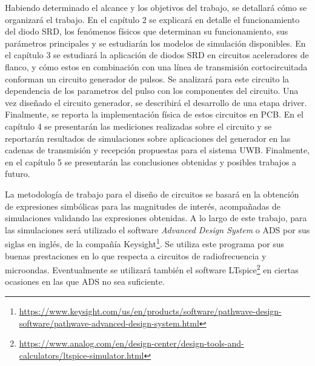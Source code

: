 Habiendo determinado el alcance y los objetivos del trabajo, se detallará cómo
se organizará el trabajo. En el capítulo 2 se explicará en detalle el
funcionamiento del diodo SRD, los fenómenos físicos que determinan su
funcionamiento, sus parámetros principales y se estudiarán los modelos de
simulación disponibles. En el capítulo 3 se estudiará la aplicación de diodos
SRD en circuitos aceleradores de flanco, y cómo estos en combinación con una
línea de transmisión cortocircuitada conforman un circuito generador de pulsos.
Se analizará para este circuito la dependencia de los parametros del pulso con
los componentes del circuito. Una vez diseñado el circuito generador, se
describirá el desarrollo de una etapa driver. Finalmente, se reporta  la
implementación física de estos circuitos en PCB. En el capítulo 4 se presentarán
las mediciones realizadas sobre el circuito y se reportarán resultados de
simulaciones sobre aplicaciones del generador en las cadenas de transmisión y
recepción propuestas para el sistema UWB. Finalmente, en el capítulo 5 se
presentarán las conclusiones obtenidas y posibles trabajos a futuro.

La metodología de trabajo para el diseño de circuitos se basará en la obtención
de expresiones simbólicas para las magnitudes de interés, acompañadas de
simulaciones validando las expresiones obtenidas. A lo largo de este trabajo,
para las simulaciones será utilizado el software \textit{Advanced Design System}
o ADS por sus siglas en inglés, de la compañía
Keysight\footnote{\url{https://www.keysight.com/us/en/products/software/pathwave-design-software/pathwave-advanced-design-system.html}}.
Se utiliza este programa por sus buenas prestaciones en lo que respecta a
circuitos de radiofrecuencia y microondas. Eventualmente se utilizará también el
software
LTspice\footnote{\url{https://www.analog.com/en/design-center/design-tools-and-calculators/ltspice-simulator.html}}
en ciertas ocasiones en las que ADS no sea suficiente.
